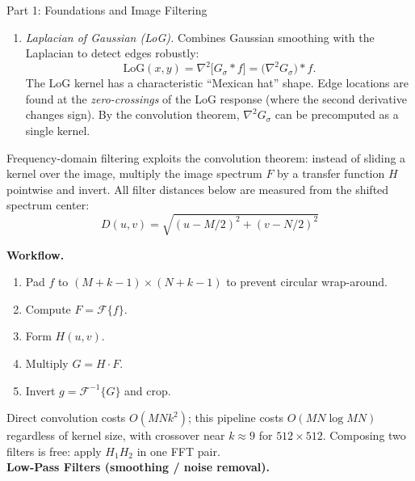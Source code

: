 \documentclass[letterpaper]{article}
\begin{document}
\begin{notes}{Part 1: Foundations and Image Filtering}
\begin{enumerate}
    \textbf{Why eight directions?} Sobel and Prewitt reconstruct gradient direction from $(G_x, G_y)$ assuming the derivative is well-approximated along the two axis-aligned directions. The Robinson operator instead directly measures responses along all $45^\circ$-spaced axes, which gives a more accurate magnitude estimate for edges that run diagonally (at $45^\circ$), where the axis-aligned kernels underestimate the gradient. The trade-off is eight convolutions instead of two.
    
    \item \textit{Laplacian of Gaussian (LoG).} Combines Gaussian smoothing with the Laplacian to detect edges robustly:
    $$\text{LoG}(x,y) = \nabla^2\bigl[G_\sigma * f\bigr] = \bigl(\nabla^2 G_\sigma\bigr) * f.$$
    The LoG kernel has a characteristic ``Mexican hat'' shape. Edge locations are found at the \emph{zero-crossings} of the LoG response (where the second derivative changes sign). By the convolution theorem, $\nabla^2 G_\sigma$ can be precomputed as a single kernel.
\end{enumerate}




\newpage


Frequency-domain filtering exploits the convolution theorem: instead of sliding a kernel over the image, multiply the image spectrum $F$ by a transfer function $H$ pointwise and invert. All filter distances below are measured from the shifted spectrum center: 
$$D(u,v)=\sqrt{(u-M/2)^2+(v-N/2)^2}$$

\textbf{Workflow.}
\begin{enumerate}
    \item Pad $f$ to $(M+k-1)\times(N+k-1)$ to prevent circular wrap-around.
    \item Compute $F=\mathcal{F}\{f\}$.
    \item Form $H(u,v)$.
    \item Multiply $G = H \cdot F$.
    \item Invert $g = \mathcal{F}^{-1}\{G\}$ and crop.
\end{enumerate}
Direct convolution costs $O(MNk^2)$; this pipeline costs $O(MN\log MN)$ regardless of kernel size, with crossover near $k\approx 9$ for $512\times512$. Composing two filters is free: apply $H_1 H_2$ in one FFT pair.\\

\textbf{Low-Pass Filters (smoothing / noise removal).}


\end{notes}
\end{document}
